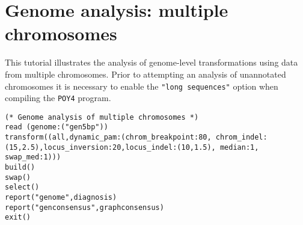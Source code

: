 \section{Genome analysis: multiple chromosomes}{\label{tutorial4.9}}

This tutorial illustrates the analysis of genome-level transformations using data from multiple chromosomes. 
Prior to attempting an analysis of unannotated chromosomes it is necessary to enable the \texttt {"long sequences"}
option when compiling the \texttt{POY4} program. 

\begin{verbatim}
(* Genome analysis of multiple chromosomes *)
read (genome:("gen5bp"))
transform((all,dynamic_pam:(chrom_breakpoint:80, chrom_indel:
(15,2.5),locus_inversion:20,locus_indel:(10,1.5), median:1,
swap_med:1)))
build()
swap()
select()
report("genome",diagnosis)
report("genconsensus",graphconsensus)
exit()
\end{verbatim}

